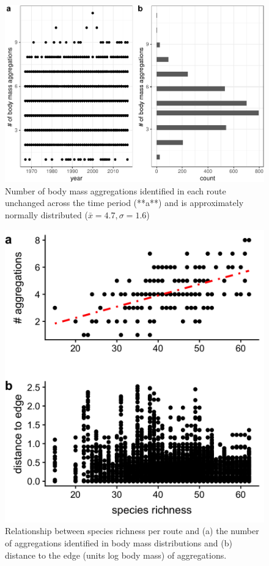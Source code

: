 \documentclass[print]{nuthesis}
\begin{document}
\begin{figure}
\includegraphics[width=0.85\linewidth]{_myDissertation_files/figure-latex/nAggsPerYear-1} \caption{Number of body mass aggregations identified in each route unchanged across the time period (**a**) and is approximately normally distributed ($\bar{x} =  4.7, \sigma = 1.6$)}\label{fig:nAggsPerYear}
\end{figure}
\begin{figure}
\includegraphics[width=0.85\linewidth]{.//chapterFiles/discontinuityAnalysis/figsCalledInDiss/distEdge_corrplot} \caption{Relationship between species richness per route and (a) the number of aggregations identified in body mass distributions and (b) distance to the edge (units log body mass) of aggregations.}\label{fig:aggEdgeCorrPlot}
\end{figure}
\end{document}
